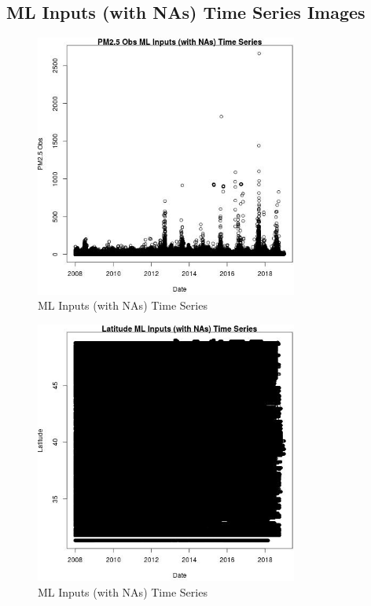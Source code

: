 
\subsection{ML Inputs (with NAs) Time Series Images} 
 

\begin{figure} 
\centering  
\includegraphics[width=0.77\textwidth]{Code_Outputs/Report_ML_input_PM25_Step4_part_e_de_duplicated_aves_compiled_2019-05-21wNAs_PM25_ObsvDate.jpg} 
\caption{\label{fig:Report_ML_input_PM25_Step4_part_e_de_duplicated_aves_compiled_2019-05-21wNAsPM25_ObsvDate}ML Inputs (with NAs) Time Series} 
\end{figure} 
 

\begin{figure} 
\centering  
\includegraphics[width=0.77\textwidth]{Code_Outputs/Report_ML_input_PM25_Step4_part_e_de_duplicated_aves_compiled_2019-05-21wNAs_LatitudevDate.jpg} 
\caption{\label{fig:Report_ML_input_PM25_Step4_part_e_de_duplicated_aves_compiled_2019-05-21wNAsLatitudevDate}ML Inputs (with NAs) Time Series} 
\end{figure} 
 

